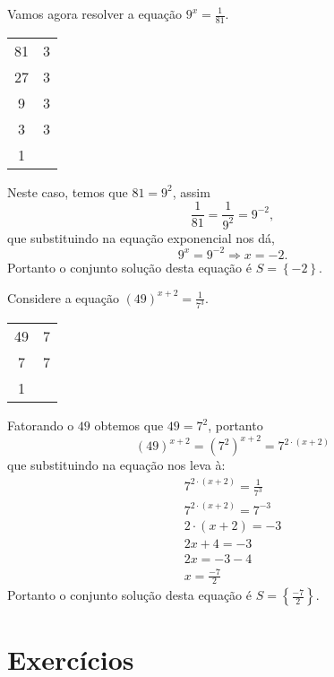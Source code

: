  \begin{exem}
  Vamos agora resolver a equação $9^x= \frac{1}{81}$.

  \begin{tabular}{c|c}
   81 & 3 \\
   27 & 3 \\
   9  & 3 \\
   3  & 3 \\
   1  &   \\
  \end{tabular}

  Neste caso, temos que $81= 9^2$, assim
\begin{equation}
\frac{1}{81}= \frac{1}{9^2}= 9^{-2} ,
\end{equation}
  que substituindo na equação exponencial nos dá,
\begin{equation}
9^x= 9^{-2} \Rightarrow x= -2 .
\end{equation}
  Portanto o conjunto solução desta equação é $S= \left\{ -2 \right\}$.
 \end{exem}

 \begin{exem}
  Considere a equação $(49)^{x+2}= \frac{1}{7^3}$.

  \begin{tabular}{c|c}
   49 & 7 \\
   7  & 7 \\
   1  &   \\
  \end{tabular}

  Fatorando o $49$ obtemos que $49= 7^2$, portanto
\begin{equation}
(49)^{x+2}= (7^2)^{x+2}= 7^{2\cdot (x+2)}
\end{equation}
  que substituindo na equação nos leva à:
  \begin{eqnarray*}
   7^{2\cdot (x+2)}= \frac{1}{7^3} \\
   7^{2\cdot (x+2)}= 7^{-3} \\
   2\cdot (x+2) = -3 \\
   2x + 4 = -3 \\
   2x= -3 -4 \\
   x= \frac{-7}{2}
  \end{eqnarray*}
  Portanto o conjunto solução desta equação é $S= \left\{ \frac{-7}{2} \right\}$.
 \end{exem}
 
\section{Exercícios}

